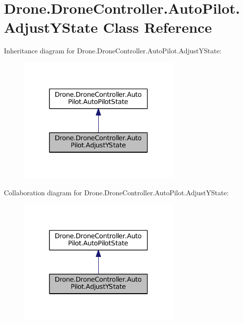 \hypertarget{class_drone_1_1_drone_controller_1_1_auto_pilot_1_1_adjust_y_state}{}\section{Drone.\+Drone\+Controller.\+Auto\+Pilot.\+Adjust\+Y\+State Class Reference}
\label{class_drone_1_1_drone_controller_1_1_auto_pilot_1_1_adjust_y_state}


Inheritance diagram for Drone.\+Drone\+Controller.\+Auto\+Pilot.\+Adjust\+Y\+State\+:\nopagebreak
\begin{figure}[H]
\begin{center}
\leavevmode
\includegraphics[width=230pt]{class_drone_1_1_drone_controller_1_1_auto_pilot_1_1_adjust_y_state__inherit__graph}
\end{center}
\end{figure}


Collaboration diagram for Drone.\+Drone\+Controller.\+Auto\+Pilot.\+Adjust\+Y\+State\+:\nopagebreak
\begin{figure}[H]
\begin{center}
\leavevmode
\includegraphics[width=230pt]{class_drone_1_1_drone_controller_1_1_auto_pilot_1_1_adjust_y_state__coll__graph}
\end{center}
\end{figure}
